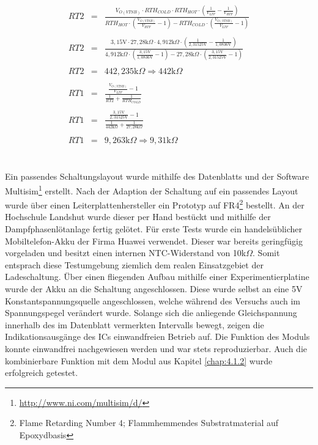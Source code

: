 \documentclass[12pt]{scrreprt} %
\begin{document}
\begin{eqnarray}
RT2&=&\frac{V_{O(VTSB)} \cdot RTH_{COLD} \cdot RTH_{HOT} \cdot \left( \frac{1}{V_{LTF}}-\frac{1}{V_{HTF}}\right)}{RTH_{HOT} \cdot \left( \frac{V_{O(VTSB)}}{V_{HTF}}-1\right)-RTH_{COLD} \cdot \left( \frac{V_{O(VTSB)}}{V_{LTF}}-1 \right)}\\
\nonumber\\
RT2&=&\frac{3,15\text{V} \cdot 27,28\text{k}\Omega \cdot4,912\text{k}\Omega \cdot \left( \frac{1}{2,31525\text{V}}-\frac{1}{1,0836\text{V}}\right)}{4,912\text{k}\Omega \cdot \left( \frac{3,15\text{V}}{1,0836\text{V}}-1\right)-27,28\text{k}\Omega \cdot \left( \frac{3,15\text{V}}{2,31525\text{V}}-1 \right)}\\
\nonumber\\
RT2&=& 442,235 \text{k} \Omega \Rightarrow 442\text{k} \Omega\\
\nonumber\\
RT1&=&\frac{\frac{V_{O(VTSB)}}{V_{LTF}}-1}{\frac{1}{RT2}+\frac{1}{RTH_{COLD}}}\\
\nonumber\\
RT1&=&\frac{\frac{3,15\text{V}}{2,31525\text{V}}-1}{\frac{1}{442\text{k} \Omega}+\frac{1}{27,28\text{k}\Omega}}\\
\nonumber\\
RT1&=&9,263\text{k}\Omega \Rightarrow 9,31\text{k}\Omega
\end{eqnarray}
\\
\\
Ein passendes Schaltungslayout wurde mithilfe des Datenblatts \citep{BQ24100} und der Software Multisim\footnote{\url{http://www.ni.com/multisim/d/}} erstellt. Nach der Adaption der Schaltung auf ein passendes Layout wurde über einen Leiterplattenhersteller ein Prototyp auf FR4\footnote{Flame Retarding Number 4; Flammhemmendes Substratmaterial auf Epoxydbasis} bestellt. An der Hochschule Landshut wurde dieser per Hand bestückt und mithilfe der Dampfphasenlötanlage fertig gelötet. Für erste Tests wurde ein handelsüblicher Mobiltelefon-Akku der Firma Huawei verwendet. Dieser war bereits geringfügig vorgeladen und besitzt einen internen NTC-Widerstand von 10k$\Omega$. Somit entsprach diese Testumgebung ziemlich dem realen Einsatzgebiet der Ladeschaltung. Über einen fliegenden Aufbau mithilfe einer Experimentierplatine wurde der Akku an die Schaltung angeschlossen. Diese wurde selbst an eine 5V Konstantspannungsquelle angeschlossen, welche während des Versuchs auch im Spannungspegel verändert wurde. Solange sich die anliegende Gleichspannung innerhalb des im Datenblatt vermerkten Intervalls bewegt, zeigen die Indikationsausgänge des ICs einwandfreien Betrieb auf. Die Funktion des Moduls konnte einwandfrei nachgewiesen werden und war stets reproduzierbar. Auch die kombinierbare Funktion mit dem Modul aus Kapitel \vref{chap:4.1.2} wurde erfolgreich getestet.
\end{document}
